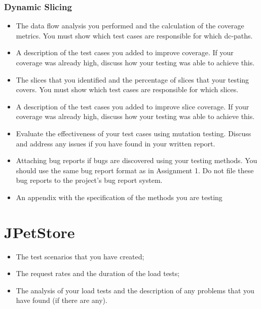\documentclass[fontsize=12pt,paper=letter,twoside]{scrartcl}
\begin{document}
\subsubsection{Dynamic Slicing}


\begin{itemize}
\item The data flow analysis you performed and the calculation of the coverage metrics. You must
show which test cases are responsible for which dc-paths.
\item A description of the test cases you added to improve coverage. If your coverage was already high,
discuss how your testing was able to achieve this.
\item The slices that you identified and the percentage of slices that your testing covers. You must
show which test cases are responsible for which slices.
\item A description of the test cases you added to improve slice coverage. If your coverage was
already high, discuss how your testing was able to achieve this.
\item Evaluate the effectiveness of your test cases using mutation testing. Discuss and address any
issues if you have found in your written report.
\item Attaching bug reports if bugs are discovered using your testing methods. You should use the
same bug report format as in Assignment 1. Do not file these bug reports to the project’s bug
report system.
\item An appendix with the specification of the methods you are testing
\end{itemize}

\section{JPetStore}

\begin{itemize}
\item The test scenarios that you have created;
\item The request rates and the duration of the load tests;
\item The analysis of your load tests and the description of any problems that you have found (if there
are any).
\end{itemize}
\end{document}
